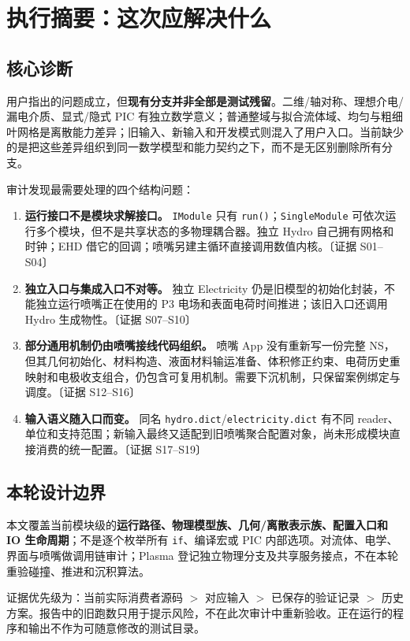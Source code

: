 \documentclass[UTF8,a4paper,11pt,fontset=fandol]{ctexart}
\numberwithin{equation}{section}
\newcommand{\code}[1]{\nolinkurl{#1}}
\newcommand{\ev}[1]{\textcolor{accent}{〔证据 #1〕}}
\begin{document}
\section{执行摘要：这次应解决什么}
\subsection{核心诊断}
用户指出的问题成立，但\textbf{现有分支并非全部是测试残留}。二维/轴对称、理想介电/漏电介质、显式/隐式 PIC 有独立数学意义；普通整域与拟合流体域、均匀与粗细叶网格是离散能力差异；旧输入、新输入和开发模式则混入了用户入口。当前缺少的是把这些差异组织到同一数学模型和能力契约之下，而不是无区别删除所有分支。

审计发现最需要处理的四个结构问题：
\begin{enumerate}
\item \textbf{运行接口不是模块求解接口。} \code{IModule} 只有 \code{run()}；\code{SingleModule} 可依次运行多个模块，但不是共享状态的多物理耦合器。独立 Hydro 自己拥有网格和时钟；EHD 借它的回调；喷嘴另建主循环直接调用数值内核。\ev{S01--S04}
\item \textbf{独立入口与集成入口不对等。} 独立 Electricity 仍是旧模型的初始化封装，不能独立运行喷嘴正在使用的 P3 电场和表面电荷时间推进；该旧入口还调用 Hydro 生成物性。\ev{S07--S10}
\item \textbf{部分通用机制仍由喷嘴接线代码组织。} 喷嘴 App 没有重新写一份完整 NS，但其几何初始化、材料构造、液面材料输运准备、体积修正约束、电荷历史重映射和电极收支组合，仍包含可复用机制。需要下沉机制，只保留案例绑定与调度。\ev{S12--S16}
\item \textbf{输入语义随入口而变。} 同名 \code{hydro.dict}/\code{electricity.dict} 有不同 reader、单位和支持范围；新输入最终又适配到旧喷嘴聚合配置对象，尚未形成模块直接消费的统一配置。\ev{S17--S19}
\end{enumerate}

\subsection{本轮设计边界}
本文覆盖当前模块级的\textbf{运行路径、物理模型族、几何/离散表示族、配置入口和 IO 生命周期}；不是逐个枚举所有 \code{if}、编译宏或 PIC 内部选项。对流体、电学、界面与喷嘴做调用链审计；Plasma 登记独立物理分支及共享服务接点，不在本轮重验碰撞、推进和沉积算法。

证据优先级为：当前实际消费者源码 $>$ 对应输入 $>$ 已保存的验证记录 $>$ 历史方案。报告中的旧跑数只用于提示风险，不在此次审计中重新验收。正在运行的程序和输出不作为可随意修改的测试目录。
\end{document}
